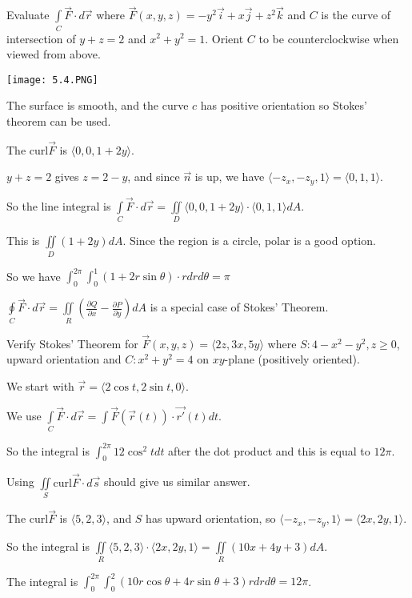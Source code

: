 \documentclass[../calc3.tex]{subfiles}
\begin{document}
\begin{example}
    Evaluate $\int\limits_{C}\vec{F}\cdot d\vec{r}$ where $\vec{F}(x,y,z)=-y^2\vec{i}+x\vec{j}+z^2\vec{k}$ and $C$ is the curve of intersection of $y+z=2$ and $x^2+y^2=1$. Orient $C$ to be counterclockwise when viewed from above.

    \begin{center}
        \texttt{[image: 5.4.PNG]}
    \end{center}

    The surface is smooth, and the curve $c$ has positive orientation so Stokes' theorem can be used.

    The curl$\vec{F}$ is $\langle 0,0,1+2y\rangle$.

    $y+z=2$ gives $z=2-y$, and since $\vec{n}$ is up, we have $\langle -z_x,-z_y,1\rangle = \langle 0,1,1\rangle$.

    So the line integral is $\int\limits_{C}\vec{F}\cdot d\vec{r}=\iint\limits_{D}\langle 0,0,1+2y\rangle \cdot \langle 0,1,1\rangle dA$.

    This is $\iint\limits_{D}(1+2y)dA$. Since the region is a circle, polar is a good option.

    So we have $\int_0^{2\pi}\int_0^1 (1+2r\sin\theta)\cdot r dr d\theta = \pi$
\end{example}

$\oint\limits_{C}\vec{F}\cdot d\vec{r}=\iint\limits_{R}\left(\frac{\partial Q}{\partial x}-\frac{\partial P}{\partial y}\right)dA$ is a special case of Stokes' Theorem.

\begin{example}
    Verify Stokes' Theorem for $\vec{F}(x,y,z)=\langle 2z,3x,5y\rangle$ where $S: 4-x^2-y^2, z\geq 0$, upward orientation and $C: x^2+y^2=4$ on $xy$-plane (positively oriented).

    We start with $\vec{r}=\langle 2\cos t,2\sin t,0\rangle$.

    We use $\int\limits_{C}\vec{F}\cdot d\vec{r}=\int\vec{F}(\vec{r}(t))\cdot \vec{r'}(t)dt$.

    So the integral is $\int_0^{2\pi} 12\cos^2 t dt$ after the dot product and this is equal to $12\pi$.

    Using $\iint\limits_{S}\text{curl}\vec{F}\cdot d\vec{s}$ should give us similar answer.

    The curl$\vec{F}$ is $\langle 5,2,3\rangle$, and $S$ has upward orientation, so $\langle -z_x,-z_y,1\rangle = \langle 2x,2y,1\rangle$.

    So the integral is $\iint\limits_{R}\langle 5,2,3\rangle\cdot \langle 2x,2y,1\rangle = \iint\limits_{R}(10x+4y+3)dA$.

    The integral is $\int_0^{2\pi}\int_0^2 (10r\cos\theta+4r\sin\theta+3)r dr d\theta = 12\pi$.
\end{example}
\end{document}
